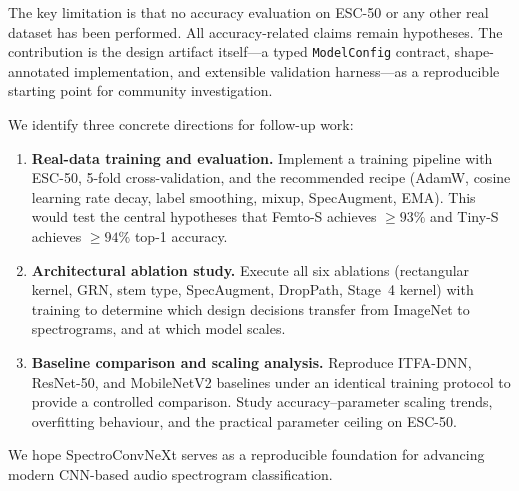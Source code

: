 \documentclass{article}
\begin{document}
The key limitation is that no accuracy evaluation on ESC-50 or any other
real dataset has been performed. All accuracy-related claims remain hypotheses.
The contribution is the design artifact itself---a typed \texttt{ModelConfig}
contract, shape-annotated implementation, and extensible validation harness---as
a reproducible starting point for community investigation.

We identify three concrete directions for follow-up work:

\begin{enumerate}
  \item \textbf{Real-data training and evaluation.} Implement a training
  pipeline with ESC-50, 5-fold cross-validation, and the recommended recipe
  (AdamW, cosine learning rate decay, label smoothing, mixup, SpecAugment, EMA).
  This would test the central hypotheses that Femto-S achieves $\geq 93\%$ and
  Tiny-S achieves $\geq 94\%$ top-1 accuracy.
  \item \textbf{Architectural ablation study.} Execute all six ablations
  (rectangular kernel, GRN, stem type, SpecAugment, DropPath, Stage~4 kernel)
  with training to determine which design decisions transfer from ImageNet to
  spectrograms, and at which model scales.
  \item \textbf{Baseline comparison and scaling analysis.} Reproduce ITFA-DNN,
  ResNet-50, and MobileNetV2 baselines under an identical training protocol to
  provide a controlled comparison. Study accuracy--parameter scaling trends,
  overfitting behaviour, and the practical parameter ceiling on ESC-50.
\end{enumerate}

We hope SpectroConvNeXt serves as a reproducible foundation for advancing
modern CNN-based audio spectrogram classification.


\end{document}
